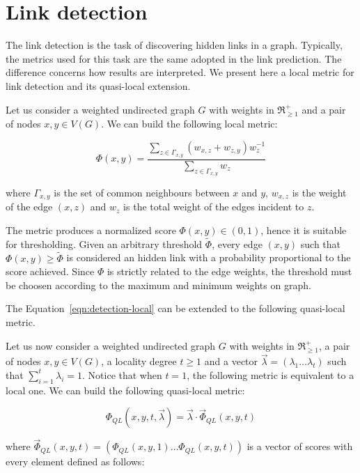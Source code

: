 \section{Link detection}
\label{sec:link-detection}

The link detection is the task of discovering hidden links in a graph. 
Typically, the metrics used for this task are the same adopted in the link prediction. 
The difference concerns how results are interpreted.
We present here a local metric for link detection and its quasi-local extension.

Let us consider a weighted undirected graph $G$ with weights in $\Re_{\geq1}^{+}$ and a pair of nodes $x,y\in V(G)$.
We can build the following local metric:


\begin{equation}
\label{eqn:detection-local}
\Phi(x,y)=
\frac{\sum\limits_{z\in\Gamma_{x,y}}(w_{x,z}+w_{z,y})w_{z}^{-1}}
{\sum\limits_{z\in\Gamma_{x,y}}w_{z}}
\end{equation}

where 
$\Gamma_{x,y}$ is the set of common neighbours between $x$ and $y$,
$w_{x,z}$ is the weight of the edge $(x,z)$ and
$w_{z}$ is the total weight of the edges incident to $z$.

The metric produces a normalized score $\Phi(x,y)\in(0,1)$, hence it is suitable for thresholding.
Given an arbitrary threshold $\tilde{\Phi}$, every edge $(x,y)$ such that $\Phi(x,y)\geq\tilde{\Phi}$ is considered an hidden link with a probability proportional to the score achieved.
Since $\Phi$ is strictly related to the edge weights, the threshold must be choosen according to the maximum and minimum weights on graph.

The Equation~\ref{eqn:detection-local} can be extended to the following quasi-local metric.

Let us now consider a weighted undirected graph $G$ with weights in $\Re_{\geq1}^{+}$, a pair of nodes $x,y\in V(G)$, a locality degree $t\geq 1$ and a vector $\vec{\lambda}=(\lambda_{1}\ldots\lambda_{t})$ such that $\sum_{i=1}^{t}\lambda_{i}=1$. Notice that when $t=1$, the following metric is equivalent to a local one.
We can build the following quasi-local metric:

\begin{equation}
\label{eqn:detection-quasi-local-1}
\Phi_{QL}(x,y,t,\vec{\lambda})=\vec{\lambda}\cdot\vec{\Phi}_{QL}(x,y,t)
\end{equation}

where $\vec{\Phi}_{QL}(x,y,t)=(\Phi_{QL}(x,y,1)\ldots\Phi_{QL}(x,y,t))$ is a vector of scores with every element defined as follows:

